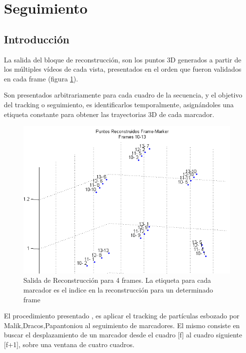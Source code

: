 \section{Seguimiento}

\subsection{Introducción}

La salida del bloque de reconstrucción, son los puntos 3D generados a partir de los múltiples vídeos de cada vista, presentados en el orden que fueron validados en cada frame (figura \ref{reconstr_00}).

Son presentados arbitrariamente para cada cuadro de la secuencia, y el objetivo del tracking o seguimiento, es identificarlos temporalmente, asignándoles una etiqueta constante para obtener las trayectorias 3D de cada marcador.

\begin{figure}[hbt]
\begin{center}
\includegraphics[scale=0.8]{img/Tracking/00_Salida_Reconstruccion}
\end{center}
\caption{Salida de Reconstrucción para 4 frames. La etiqueta para cada marcador es el indice en la reconstrucción para un determinado frame}
\label{reconstr_00}
\end{figure}

El procedimiento presentado \cite{herda}, es aplicar el tracking de partículas esbozado por Malik,Dracos,Papantoniou \cite{griegos} al seguimiento de marcadores. El mismo consiste en buscar el desplazamiento de un marcador desde el cuadro [f] al cuadro siguiente [f+1], sobre una ventana de cuatro cuadros. 

